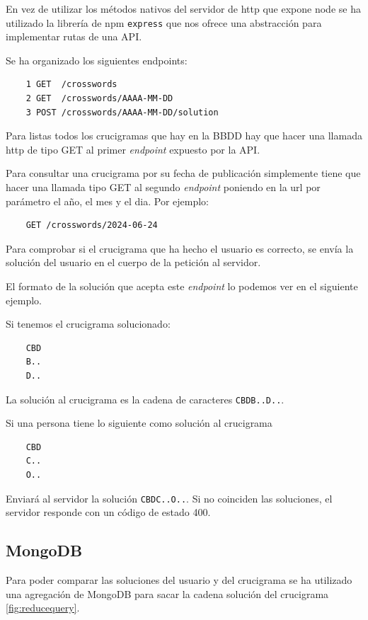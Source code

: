 \documentclass[12pt, a4paper]{article}
\begin{document}
En vez de utilizar los métodos nativos del servidor de http que expone node se ha
utilizado la librería de npm \verb*|express| que nos ofrece una abstracción para 
implementar rutas de una API.

Se ha organizado los siguientes endpoints:

\begin{verbatim}
	1 GET  /crosswords
	2 GET  /crosswords/AAAA-MM-DD
	3 POST /crosswords/AAAA-MM-DD/solution
\end{verbatim}

Para listas todos los crucigramas que hay en la BBDD hay que hacer una llamada http
de tipo GET al primer \textit{endpoint} expuesto por la API.

Para consultar una crucigrama por su fecha de publicación simplemente tiene que hacer
una llamada tipo GET al segundo \textit{endpoint} poniendo en la url por parámetro
el año, el mes y el dia. Por ejemplo:

\begin{verbatim}
	GET /crosswords/2024-06-24
\end{verbatim}

Para comprobar si el crucigrama que ha hecho el usuario es correcto, se envía la 
solución del usuario en el cuerpo de la petición al servidor.

El formato de la solución que acepta este \textit{endpoint} lo podemos ver en
el siguiente ejemplo.

Si tenemos el crucigrama solucionado:

\begin{verbatim}
	CBD
	B..
	D..
\end{verbatim}

La solución al crucigrama es la cadena de caracteres \verb|CBDB..D..|.

Si una persona tiene lo siguiente como solución al crucigrama

\begin{verbatim}
	CBD
	C..
	O..
\end{verbatim}

Enviará al servidor la solución \verb*|CBDC..O..|. Si no coinciden las soluciones,
el servidor responde con un código de estado 400.

\subsection{MongoDB}

Para poder comparar las soluciones del usuario y del crucigrama se ha utilizado
una agregación de MongoDB para sacar la cadena solución del crucigrama \ref{fig:reducequery}.
\end{document}
